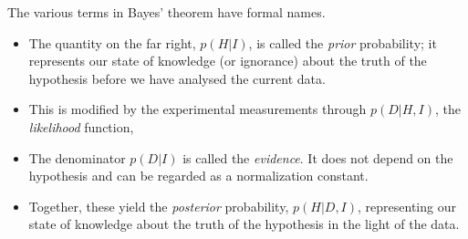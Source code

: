 \documentclass[%
oneside,                 %
final,                   %
10pt]{article}
\begin{document}
The various terms in Bayes’ theorem have formal names. 
\begin{itemize}
\item The quantity on the far right, $p(H|I)$, is called the \emph{prior} probability; it represents our state of knowledge (or ignorance) about the truth of the hypothesis before we have analysed the current data. 

\item This is modified by the experimental measurements through $p(D|H,I)$, the \emph{likelihood} function, 

\item The denominator $p(D|I)$ is called the \emph{evidence}. It does not depend on the hypothesis and can be regarded as a normalization constant.

\item Together, these yield the \emph{posterior} probability, $p(H|D, I )$, representing our state of knowledge about the truth of the hypothesis in the light of the data. 
\end{itemize}

\noindent

\end{document}
